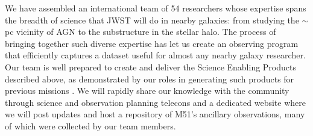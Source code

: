\documentclass[12pt]{article}
\begin{document}




\vspace{0.1in}


 We have assembled an international team of 54 researchers whose expertise spans the breadth of science that JWST will do in nearby galaxies: from studying the $\sim$pc vicinity of AGN to the substructure in the stellar halo. The process of bringing together such diverse expertise has let us create an observing program that efficiently captures a dataset useful for almost any nearby galaxy researcher. Our team is well prepared to create and deliver the Science Enabling Products described above, as demonstrated by our roles in generating such products for previous missions \citep{dale2006,smith2007,gordon2008,aniano2011,boyer2013}.  We will rapidly share our knowledge with the community through science and observation planning telecons and a dedicated website where we will post updates and host a repository of M51's ancillary observations, many of which were collected by our team members.
\end{document}
